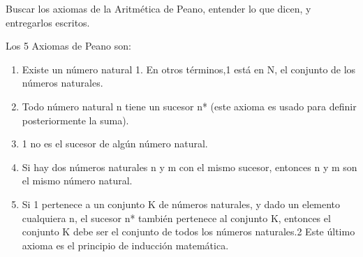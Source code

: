 \begin{problem}[11]
Buscar los axiomas de la Aritm\'etica de Peano, entender lo que dicen, y entregarlos escritos.

\solution

Los 5 Axiomas de Peano son:
\begin{enumerate}
\item Existe un número natural 1. En otros términos,1 está en N, el conjunto de los números naturales.
\item Todo número natural n tiene un sucesor n* (este axioma es usado para definir posteriormente la suma).
\item 1 no es el sucesor de algún número natural.
\item Si hay dos números naturales n y m con el mismo sucesor, entonces n y m son el mismo número natural.
\item Si 1 pertenece a un conjunto K de números naturales, y dado un elemento cualquiera n, el sucesor n* también pertenece al conjunto K, entonces el conjunto K debe ser el conjunto de todos los números naturales.2 Este último axioma es el principio de inducción matemática.
\end{enumerate}
\end{problem}




